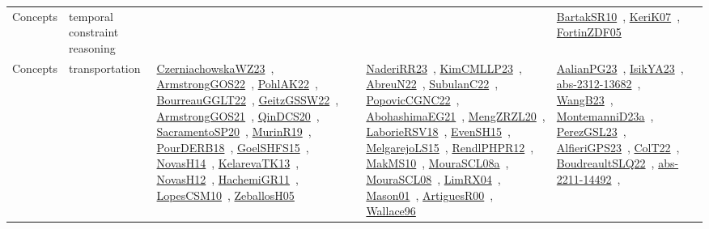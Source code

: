 {\begin{longtable}{lp{3cm}>{\raggedright\arraybackslash}p{6cm}>{\raggedright\arraybackslash}p{6cm}>{\raggedright\arraybackslash}p{8cm}}
Concepts & temporal constraint reasoning &  &  & \href{articles/BartakSR10.pdf}{BartakSR10}~\cite{BartakSR10}, \href{papers/KeriK07.pdf}{KeriK07}~\cite{KeriK07}, \href{papers/FortinZDF05.pdf}{FortinZDF05}~\cite{FortinZDF05}\\
Concepts & transportation & \href{articles/CzerniachowskaWZ23.pdf}{CzerniachowskaWZ23}~\cite{CzerniachowskaWZ23}, \href{papers/ArmstrongGOS22.pdf}{ArmstrongGOS22}~\cite{ArmstrongGOS22}, \href{articles/PohlAK22.pdf}{PohlAK22}~\cite{PohlAK22}, \href{articles/BourreauGGLT22.pdf}{BourreauGGLT22}~\cite{BourreauGGLT22}, \href{papers/GeitzGSSW22.pdf}{GeitzGSSW22}~\cite{GeitzGSSW22}, \href{papers/ArmstrongGOS21.pdf}{ArmstrongGOS21}~\cite{ArmstrongGOS21}, \href{articles/QinDCS20.pdf}{QinDCS20}~\cite{QinDCS20}, \href{articles/SacramentoSP20.pdf}{SacramentoSP20}~\cite{SacramentoSP20}, \href{papers/MurinR19.pdf}{MurinR19}~\cite{MurinR19}, \href{articles/PourDERB18.pdf}{PourDERB18}~\cite{PourDERB18}, \href{articles/GoelSHFS15.pdf}{GoelSHFS15}~\cite{GoelSHFS15}, \href{articles/NovasH14.pdf}{NovasH14}~\cite{NovasH14}, \href{papers/KelarevaTK13.pdf}{KelarevaTK13}~\cite{KelarevaTK13}, \href{articles/NovasH12.pdf}{NovasH12}~\cite{NovasH12}, \href{articles/HachemiGR11.pdf}{HachemiGR11}~\cite{HachemiGR11}, \href{articles/LopesCSM10.pdf}{LopesCSM10}~\cite{LopesCSM10}, \href{articles/ZeballosH05.pdf}{ZeballosH05}~\cite{ZeballosH05} & \href{articles/NaderiRR23.pdf}{NaderiRR23}~\cite{NaderiRR23}, \href{papers/KimCMLLP23.pdf}{KimCMLLP23}~\cite{KimCMLLP23}, \href{articles/AbreuN22.pdf}{AbreuN22}~\cite{AbreuN22}, \href{articles/SubulanC22.pdf}{SubulanC22}~\cite{SubulanC22}, \href{papers/PopovicCGNC22.pdf}{PopovicCGNC22}~\cite{PopovicCGNC22}, \href{articles/AbohashimaEG21.pdf}{AbohashimaEG21}~\cite{AbohashimaEG21}, \href{articles/MengZRZL20.pdf}{MengZRZL20}~\cite{MengZRZL20}, \href{articles/LaborieRSV18.pdf}{LaborieRSV18}~\cite{LaborieRSV18}, \href{papers/EvenSH15.pdf}{EvenSH15}~\cite{EvenSH15}, \href{papers/MelgarejoLS15.pdf}{MelgarejoLS15}~\cite{MelgarejoLS15}, \href{papers/RendlPHPR12.pdf}{RendlPHPR12}~\cite{RendlPHPR12}, \href{papers/MakMS10.pdf}{MakMS10}~\cite{MakMS10}, \href{papers/MouraSCL08a.pdf}{MouraSCL08a}~\cite{MouraSCL08a}, \href{papers/MouraSCL08.pdf}{MouraSCL08}~\cite{MouraSCL08}, \href{papers/LimRX04.pdf}{LimRX04}~\cite{LimRX04}, \href{articles/Mason01.pdf}{Mason01}~\cite{Mason01}, \href{articles/ArtiguesR00.pdf}{ArtiguesR00}~\cite{ArtiguesR00}, \href{articles/Wallace96.pdf}{Wallace96}~\cite{Wallace96} & \href{papers/AalianPG23.pdf}{AalianPG23}~\cite{AalianPG23}, \href{articles/IsikYA23.pdf}{IsikYA23}~\cite{IsikYA23}, \href{articles/abs-2312-13682.pdf}{abs-2312-13682}~\cite{abs-2312-13682}, \href{papers/WangB23.pdf}{WangB23}~\cite{WangB23}, \href{articles/MontemanniD23a.pdf}{MontemanniD23a}~\cite{MontemanniD23a}, \href{papers/PerezGSL23.pdf}{PerezGSL23}~\cite{PerezGSL23}, \href{articles/AlfieriGPS23.pdf}{AlfieriGPS23}~\cite{AlfieriGPS23}, \href{articles/ColT22.pdf}{ColT22}~\cite{ColT22}, \href{papers/BoudreaultSLQ22.pdf}{BoudreaultSLQ22}~\cite{BoudreaultSLQ22}, \href{articles/abs-2211-14492.pdf}{abs-2211-14492}~\cite{abs-2211-14492}, 
\end{longtable}}
